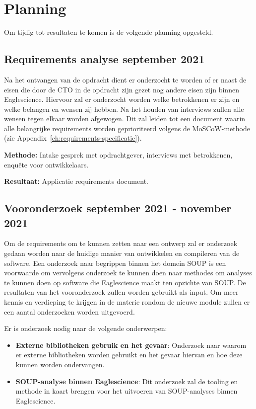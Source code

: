 \section{Planning}\label{sec:planning}
Om tijdig tot resultaten te komen is de volgende planning opgesteld.

\subsection{Requirements analyse \textbf{september 2021}}\label{subsec:requirements-analyse}
Na het ontvangen van de opdracht dient er onderzocht te worden of er naast de eisen die door de CTO in de opdracht zijn gezet nog andere eisen zijn binnen Eaglescience. Hiervoor zal er onderzocht worden welke betrokkenen er zijn en welke belangen en wensen zij hebben. Na het houden van interviews zullen alle wensen tegen elkaar worden afgewogen. Dit zal leiden tot een document waarin alle belangrijke requirements worden geprioriteerd volgens de MoSCoW-methode (zie Appendix~\ref{ch:requirements-specificatie}).

\textbf{Methode:} Intake gesprek met opdrachtgever, interviews met betrokkenen, enquête voor ontwikkelaars.

\textbf{Resultaat:} Applicatie requirements document.

\subsection{Vooronderzoek \textbf{september 2021 - november 2021 }}\label{subsec:onderzoek}
Om de requirements om te kunnen zetten naar een ontwerp zal er onderzoek gedaan worden naar de huidige manier van ontwikkelen en compileren van de software. Een onderzoek naar begrippen binnen het domein SOUP is een voorwaarde om vervolgens onderzoek te kunnen doen naar methodes om analyses te kunnen doen op software die Eaglescience maakt ten opzichte van SOUP. De resultaten van het vooronderzoek zullen worden gebruikt als input.
Om meer kennis en verdieping te krijgen in de materie rondom de nieuwe module zullen er een aantal onderzoeken worden uitgevoerd.


Er is onderzoek nodig naar de volgende onderwerpen:
\begin{itemize}
    \item \textbf{Externe bibliotheken gebruik en het gevaar}: Onderzoek naar waarom er externe bibliotheken worden gebruikt en het gevaar hiervan en hoe deze kunnen worden ondervangen.
    \item \textbf{SOUP-analyse binnen Eaglescience}: Dit onderzoek zal de tooling en methode in kaart brengen voor het uitvoeren van SOUP-analyses binnen Eaglescience.
\end{itemize}

